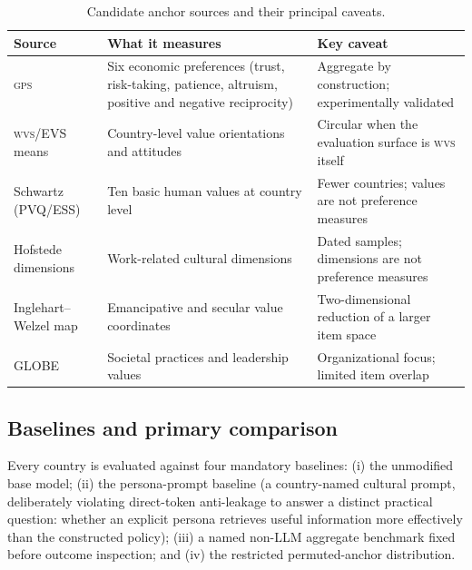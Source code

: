 \documentclass[10pt,letterpaper]{article}
\newcommand{\WVS}{\textsc{wvs}}
\newcommand{\GPS}{\textsc{gps}}
\begin{document}
\begin{table}[H]
\centering
\small
\caption{Candidate anchor sources and their principal caveats.}
\label{tab:anchor-sources}
\begin{tabularx}{\textwidth}{@{}l X l@{}}
\hline
Source & What it measures & Key caveat \\
\hline
\GPS{} & Six economic preferences (trust, risk-taking, patience, altruism, positive and negative reciprocity) & Aggregate by construction; experimentally validated \\
\WVS{}/EVS means & Country-level value orientations and attitudes & Circular when the evaluation surface is \WVS{} itself \\
Schwartz (PVQ/ESS) & Ten basic human values at country level & Fewer countries; values are not preference measures \\
Hofstede dimensions & Work-related cultural dimensions & Dated samples; dimensions are not preference measures \\
Inglehart--Welzel map & Emancipative and secular value coordinates & Two-dimensional reduction of a larger item space \\
GLOBE & Societal practices and leadership values & Organizational focus; limited item overlap \\
\hline
\end{tabularx}
\end{table}

\subsection{Baselines and primary comparison}
Every country is evaluated against four mandatory baselines: (i) the unmodified base model; (ii) the persona-prompt baseline (a country-named cultural prompt, deliberately violating direct-token anti-leakage to answer a distinct practical question: whether an explicit persona retrieves useful information more effectively than the constructed policy); (iii) a named non-LLM aggregate benchmark fixed before outcome inspection; and (iv) the restricted permuted-anchor distribution.
\end{document}

